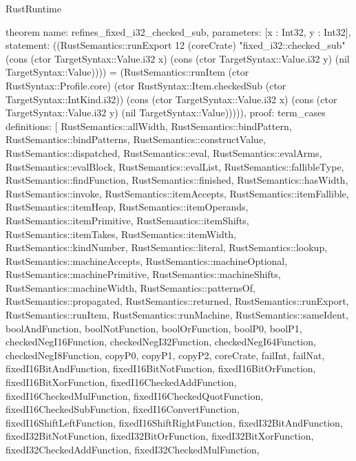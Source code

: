 \begin{lexlean}{RustRuntime}
\begin{semanticmodule}
theorem{
  name: refines_fixed_i32_checked_sub,
  parameters: [x : Int32, y : Int32],
  statement: ((RustSemantics::runExport 12 (coreCrate) "fixed_i32::checked_sub" (cons (ctor TargetSyntax::Value.i32 x) (cons (ctor TargetSyntax::Value.i32 y) (nil TargetSyntax::Value)))) = (RustSemantics::runItem (ctor RustSyntax::Profile.core) (ctor RustSyntax::Item.checkedSub (ctor TargetSyntax::IntKind.i32)) (cons (ctor TargetSyntax::Value.i32 x) (cons (ctor TargetSyntax::Value.i32 y) (nil TargetSyntax::Value))))),
  proof: term_cases{
    definitions: [
      RustSemantics::allWidth,
      RustSemantics::bindPattern,
      RustSemantics::bindPatterns,
      RustSemantics::constructValue,
      RustSemantics::dispatched,
      RustSemantics::eval,
      RustSemantics::evalArms,
      RustSemantics::evalBlock,
      RustSemantics::evalList,
      RustSemantics::fallibleType,
      RustSemantics::findFunction,
      RustSemantics::finished,
      RustSemantics::hasWidth,
      RustSemantics::invoke,
      RustSemantics::itemAccepts,
      RustSemantics::itemFallible,
      RustSemantics::itemHeap,
      RustSemantics::itemOperands,
      RustSemantics::itemPrimitive,
      RustSemantics::itemShifts,
      RustSemantics::itemTakes,
      RustSemantics::itemWidth,
      RustSemantics::kindNumber,
      RustSemantics::literal,
      RustSemantics::lookup,
      RustSemantics::machineAccepts,
      RustSemantics::machineOptional,
      RustSemantics::machinePrimitive,
      RustSemantics::machineShifts,
      RustSemantics::machineWidth,
      RustSemantics::patternsOf,
      RustSemantics::propagated,
      RustSemantics::returned,
      RustSemantics::runExport,
      RustSemantics::runItem,
      RustSemantics::runMachine,
      RustSemantics::sameIdent,
      boolAndFunction,
      boolNotFunction,
      boolOrFunction,
      boolP0,
      boolP1,
      checkedNegI16Function,
      checkedNegI32Function,
      checkedNegI64Function,
      checkedNegI8Function,
      copyP0,
      copyP1,
      copyP2,
      coreCrate,
      failInt,
      failNat,
      fixedI16BitAndFunction,
      fixedI16BitNotFunction,
      fixedI16BitOrFunction,
      fixedI16BitXorFunction,
      fixedI16CheckedAddFunction,
      fixedI16CheckedMulFunction,
      fixedI16CheckedQuotFunction,
      fixedI16CheckedSubFunction,
      fixedI16ConvertFunction,
      fixedI16ShiftLeftFunction,
      fixedI16ShiftRightFunction,
      fixedI32BitAndFunction,
      fixedI32BitNotFunction,
      fixedI32BitOrFunction,
      fixedI32BitXorFunction,
      fixedI32CheckedAddFunction,
      fixedI32CheckedMulFunction,
}}
\end{semanticmodule}
\end{lexlean}
